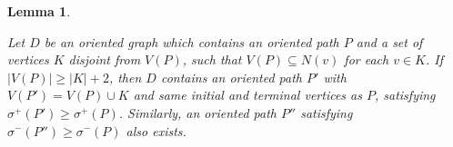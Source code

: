 \documentclass[10pt,a4paper]{amsart}
\newtheorem{lemma}{Lemma}
\newcommand{\QGr}[1]{{#1}}
\begin{document}
	\begin{lemma}\label{lem:add x between pair}

    \QGr{Let $D$ be an oriented graph which contains an oriented path $P$ and a set of vertices $K$ disjoint from $V(P)$, such that $V(P)\subseteq N(v)$ for each $v\in K$. If $|V(P)|\ge |K|+2$, then $D$ contains an oriented path $P'$ with $V(P')=V(P)\cup K$ and same initial and terminal vertices as $P$, satisfying $\sigma^+(P')\ge \sigma^+(P) $. Similarly, an oriented path $P''$ satisfying $\sigma^-(P'') \ge \sigma^-(P)$ also exists.}
	\end{lemma}
\end{document}

